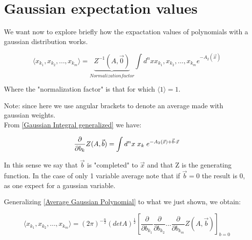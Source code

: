 \documentclass[12pt, english, a4paper]{book}
\begin{document}
\section{Gaussian expectation values}

We want now to explore briefly how the expactation values of polynomials with a gaussian distribution works.

\begin{equation}\label{Average Gaussian Polynomial}
\langle x_{k_1}, x_{k_2}, ... , x_{k_m} \rangle = \underbrace{Z^{-1}(A, \vec{0})}_{Normalization factor} \int d^n x x_{k_1}, x_{k_2}, ... , x_{k_m} e^{-A_2(\vec{x}) }
\end{equation}

Where the "normalization factor" is that for which $ \langle 1 \rangle = 1 $.

Note: since here we use angular brackets to denote an average made with gaussian weights.\\

From \eqref{Gaussian Integral generalized} we have:

$$ \frac{\partial}{\partial b_k} Z(A, \vec{b}) = \int d^n x \hspace{1mm} x_k \hspace{1mm} e^{-A_2(\vec{x}) + \vec{b} \cdot \vec{x}} $$

In this sense we say that $\vec{b}$ is "completed" to $\vec{x}$ and that Z is the generating function.
In the case of only 1 variable average note that if $\vec{b}=0$ the result is 0, as one expect for a gaussian variable.

Generalizing \eqref{Average Gaussian Polynomial} to what we just shown, we obtain:

\begin{equation}\label{Average Gaussian Partial}
\langle x_{k_1}, x_{k_2}, ... , x_{k_m} \rangle = (2\pi)^{-\frac{n}{2}} (detA)^{\frac{1}{2}} \left[ \frac{\partial}{\partial b_{k_1}} \frac{\partial}{\partial b_{k_2}} ... \frac{\partial}{\partial b_{k_m}} Z(A, \vec{b}) \right]_{b=0}
\end{equation}
\end{document}
